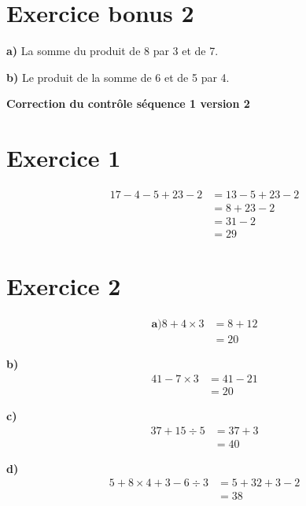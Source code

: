 \documentclass[12pt]{extarticle}
\begin{document}
\section*{Exercice bonus 2}

\textbf{a)} La somme du produit de 8 par 3 et de 7.

\textbf{b)} Le produit de la somme de 6 et de 5 par 4.

\newpage

\begin{center}
\Large\textbf{Correction du contrôle séquence 1 version 2}
\end{center}

\section*{Exercice 1}
\begin{align*}
17 - 4 - 5 + 23 - 2 &= 13 - 5 + 23 - 2 \\
                     &= 8 + 23 - 2 \\
                     &= 31 - 2 \\
                     &= 29
\end{align*}

\section*{Exercice 2}

\begin{align*}
\textbf{a)}
8 + 4 \times 3 &= 8 + 12 \\
               &= 20
\end{align*}

\textbf{b)}
\begin{align*}
41 - 7 \times 3 &= 41 - 21 \\
                &= 20
\end{align*}

\textbf{c)}
\begin{align*}
37 + 15 \div 5 &= 37 + 3 \\
               &= 40
\end{align*}

\textbf{d)}
\begin{align*}
5 + 8 \times 4 + 3 - 6 \div 3 &= 5 + 32 + 3 - 2 \\
                              &= 38
\end{align*}
\end{document}
